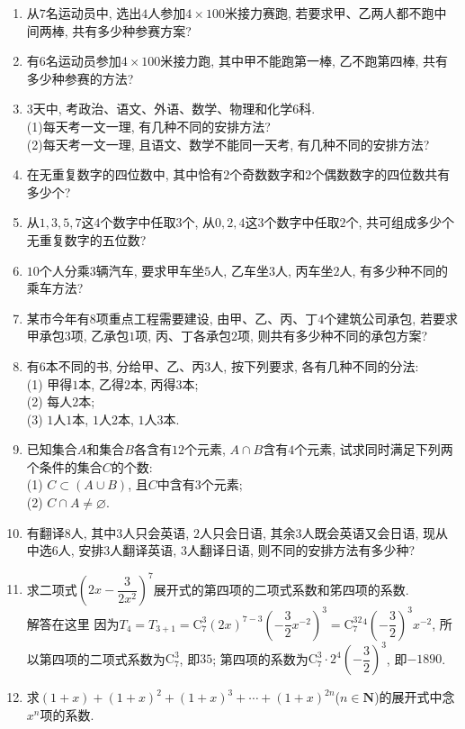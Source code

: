 \documentclass[10pt,a4paper]{article}
\begin{document}
\begin{enumerate}[1.]
\item 从$7$名运动员中, 选出$4$人参加$4\times 100$米接力赛跑, 若要求甲、乙两人都不跑中间两棒, 共有多少种参赛方案?
\item 有$6$名运动员参加$4\times 100$米接力跑, 其中甲不能跑第一棒, 乙不跑第四棒, 共有多少种参赛的方法?
\item $3$天中, 考政治、语文、外语、数学、物理和化学$6$科.\\
(1)每天考一文一理, 有几种不同的安排方法?\\
(2)每天考一文一理, 且语文、数学不能同一天考, 有几种不同的安排方法?
\item 在无重复数字的四位数中, 其中恰有$2$个奇数数字和$2$个偶数数字的四位数共有多少个?
\item 从$1, 3, 5, 7$这$4$个数字中任取$3$个, 从$0, 2, 4$这$3$个数字中任取$2$个, 共可组成多少个无重复数字的五位数?
\item $10$个人分乘$3$辆汽车, 要求甲车坐$5$人, 乙车坐$3$人, 丙车坐$2$人, 有多少种不同的乘车方法?
\item 某市今年有$8$项重点工程需要建设, 由甲、乙、丙、丁$4$个建筑公司承包, 若要求甲承包$3$项, 乙承包$1$项, 丙、丁各承包$2$项, 则共有多少种不同的承包方案?
\item 有$6$本不同的书, 分给甲、乙、丙$3$人, 按下列要求, 各有几种不同的分法:\\
(1) 甲得$1$本, 乙得$2$本, 丙得$3$本;\\
(2) 每人$2$本;\\
(3) $1$人$1$本, $1$人$2$本, $1$人$3$本.
\item 已知集合$A$和集合$B$各含有$12$个元素, $A\cap B$含有$4$个元素, 试求同时满足下列两个条件的集合$C$的个数:\\
(1) $C\subset (A\cup B)$, 且$C$中含有$3$个元素;\\
(2) $C\cap A\ne \varnothing$.
\item 有翻译$8$人, 其中$3$人只会英语, $2$人只会日语, 其余$3$人既会英语又会日语, 现从中选$6$人, 安排$3$人翻译英语, $3$人翻译日语, 则不同的安排方法有多少种?
\item 求二项式$(2x-\dfrac 3{2x^2})^7$展开式的第四项的二项式系数和笫四项的系数.\\
解答在这里  因为$T_4=T_{3+1}=\mathrm{C}_7^3(2x)^{7-3}(-\dfrac 32x^{-2})^3=\mathrm{C}_7^32^4(-\dfrac 32)^3x^{-2}$,
所以第四项的二项式系数为$\mathrm{C}_7^3$, 即$35$; 第四项的系数为$\mathrm{C}_7^3\cdot 2^4(-\dfrac 32)^3$, 即$-1890$.
\item 求$(1+x)+(1+x)^2+(1+x)^3+\cdots +(1+x)^{2n}$($n\in \mathbf{N}$)的展开式中念$x^n$项的系数.\\

\end{enumerate}
\end{document}
